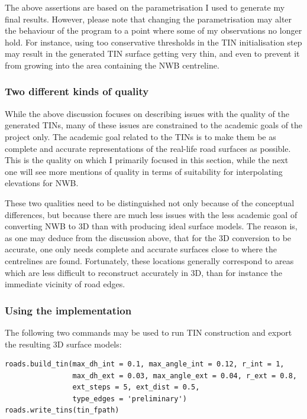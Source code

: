 The above assertions are based on the parametrisation I used to generate my final results. However, please note that changing the parametrisation may alter the behaviour of the program to a point where some of my observations no longer hold. For instance, using too conservative thresholds in the TIN initialisation step may result in the generated TIN surface getting very thin, and even to prevent it from growing into the area containing the NWB centreline.

\subsubsection{Two different kinds of quality}

While the above discussion focuses on describing issues with the quality of the generated TINs, many of these issues are constrained to the academic goals of the project only. The academic goal related to the TINs is to make them be as complete and accurate representations of the real-life road surfaces as possible. This is the quality on which I primarily focused in this section, while the next one will see more mentions of quality in terms of suitability for interpolating elevations for NWB.

These two qualities need to be distinguished not only because of the conceptual differences, but because there are much less issues with the less academic goal of converting NWB to 3D than with producing ideal surface models. The reason is, as one may deduce from the discussion above, that for the 3D conversion to be accurate, one only needs complete and accurate surfaces close to where the centrelines are found. Fortunately, these locations generally correspond to areas which are less difficult to reconstruct accurately in 3D, than for instance the immediate vicinity of road edges.

\subsubsection{Using the implementation}

The following two commands may be used to run TIN construction and export the resulting 3D surface models:

\begin{lstlisting}
roads.build_tin(max_dh_int = 0.1, max_angle_int = 0.12, r_int = 1,
                max_dh_ext = 0.03, max_angle_ext = 0.04, r_ext = 0.8,
                ext_steps = 5, ext_dist = 0.5,
                type_edges = 'preliminary')
roads.write_tins(tin_fpath)
\end{lstlisting}

